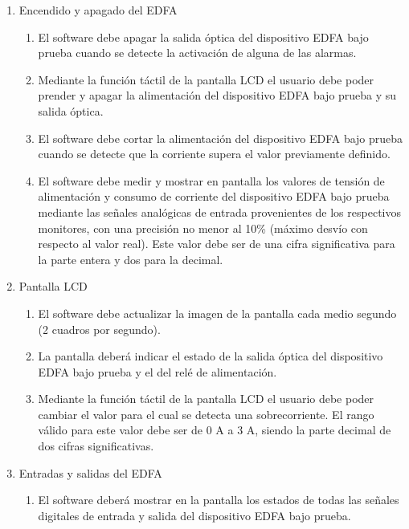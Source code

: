 \begin{enumerate}

\item Encendido y apagado del EDFA
	\begin{enumerate}
	\item \label{itm:req11}El software debe apagar la salida óptica del dispositivo 			EDFA bajo prueba cuando se detecte la activación de alguna de las 		alarmas.
	\item Mediante la función táctil de la pantalla LCD el usuario 			debe poder prender y apagar la alimentación del dispositivo EDFA 		bajo prueba y su salida óptica.
	\item El software debe cortar la alimentación del dispositivo EDFA 	bajo prueba cuando se detecte que la corriente supera el valor 			previamente definido.
	\item El software debe medir y mostrar en pantalla los valores de 		tensión de alimentación y consumo de corriente del dispositivo 			EDFA bajo prueba mediante las señales analógicas de entrada 			provenientes de los respectivos monitores, con una precisión no 		menor al 10\% (máximo desvío con respecto al valor real). Este 			valor debe ser de una cifra significativa para la parte entera y 		dos para la decimal.
	\end{enumerate}

\item Pantalla LCD
	\begin{enumerate}
	\item El software debe actualizar la imagen de la pantalla cada 		medio segundo (2 cuadros por segundo).
	\item La pantalla deberá indicar el estado de la salida óptica del 	dispositivo EDFA bajo prueba y el del relé de alimentación.
	\item Mediante la función táctil de la pantalla LCD el usuario 			debe poder cambiar el valor para el cual se detecta una 				sobrecorriente. El rango válido para este valor debe ser de 0 A a 		3 A, siendo la parte decimal de dos cifras significativas.
	\end{enumerate}
	
\item Entradas y salidas del EDFA
	\begin{enumerate}
	\item El software deberá mostrar en la pantalla los estados de todas las señales digitales de entrada y salida del dispositivo EDFA bajo prueba.
	\end{enumerate}


\end{enumerate}
